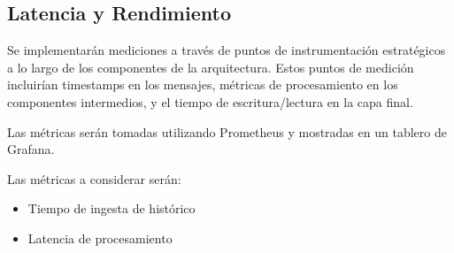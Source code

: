 \subsection{Latencia y Rendimiento}

Se implementarán mediciones a través de puntos de instrumentación estratégicos a lo largo de los componentes de la arquitectura.  
Estos puntos de medición incluirían timestamps en los mensajes, métricas de procesamiento en los componentes intermedios, y el tiempo de escritura/lectura en la capa final. 

Las métricas serán tomadas utilizando Prometheus y mostradas en un tablero de Grafana.

Las métricas a considerar serán:
\begin{itemize}
    \item Tiempo de ingesta de histórico
    \item Latencia de procesamiento
\end{itemize}
